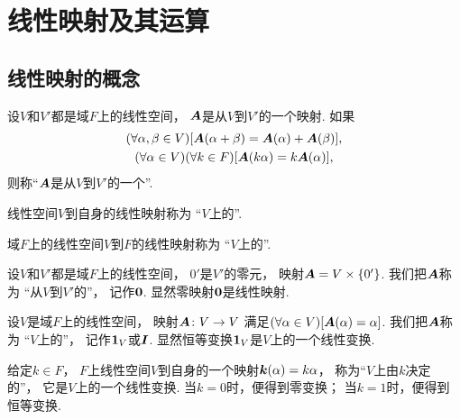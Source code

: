 \section{线性映射及其运算}
\subsection{线性映射的概念}
\begin{definition}
设\(V\)和\(V'\)都是域\(F\)上的线性空间，
\(\boldsymbol{A}\)是从\(V\)到\(V'\)的一个映射.
如果\begin{gather*}
	(\forall\alpha,\beta\in V)
	[\boldsymbol{A}(\alpha+\beta)=\boldsymbol{A}(\alpha)+\boldsymbol{A}(\beta)], \\
	(\forall\alpha\in V)
	(\forall k\in F)
	[\boldsymbol{A}(k\alpha)=k\boldsymbol{A}(\alpha)],
\end{gather*}
则称“\(\boldsymbol{A}\)是从\(V\)到\(V'\)的一个”.
\end{definition}

线性空间\(V\)到自身的线性映射称为
“\(V\)上的”.

域\(F\)上的线性空间\(V\)到\(F\)的线性映射称为
“\(V\)上的”.

\begin{example}
设\(V\)和\(V'\)都是域\(F\)上的线性空间，
\(0'\)是\(V'\)的零元，
映射\(\boldsymbol{A}=V\times\{0'\}\).
我们把\(\boldsymbol{A}\)称为
“从\(V\)到\(V'\)的”，
记作\(\boldsymbol0\).
显然零映射\(\boldsymbol0\)是线性映射.
\end{example}

\begin{example}
设\(V\)是域\(F\)上的线性空间，
映射\(\boldsymbol{A}\colon V\to V\)
满足\((\forall\alpha\in V)[\boldsymbol{A}(\alpha)=\alpha]\).
我们把\(\boldsymbol{A}\)称为
“\(V\)上的”，
记作\(\boldsymbol1_V\)或\(\boldsymbol{I}\).
显然恒等变换\(\boldsymbol1_V\)是\(V\)上的一个线性变换.
\end{example}

\begin{example}
给定\(k\in F\)，
\(F\)上线性空间\(V\)到自身的一个映射\(\boldsymbol{k}(\alpha)=k\alpha\)，
称为“\(V\)上由\(k\)决定的”，
它是\(V\)上的一个线性变换.
当\(k=0\)时，便得到零变换；
当\(k=1\)时，便得到恒等变换.
\end{example}

